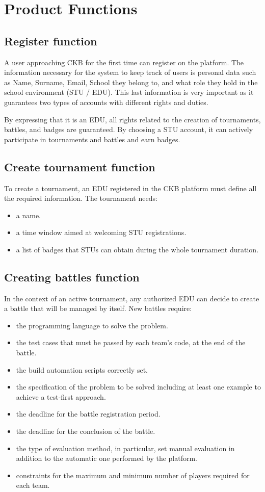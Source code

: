 \section{Product Functions}
\subsection{Register function}
A user approaching CKB for the first time can register on the platform.
The information necessary for the system to keep track of users is personal data such as Name, Surname, Email, School they belong to, and what role they hold in the school environment (STU / EDU).
This last information is very important as it guarantees two types of accounts with different rights and duties.

By expressing that it is an EDU, all rights related to the creation of tournaments, battles, and badges are guaranteed.
By choosing a STU account, it can actively participate in tournaments and battles and earn badges.

\subsection{Create tournament function}
To create a tournament, an EDU registered in the CKB platform must define all the required information.
The tournament needs:
\begin{itemize}
    \item a name.
    \item a time window aimed at welcoming STU registrations.
    \item a list of badges that STUs can obtain during the whole tournament duration.
\end{itemize}

\subsection{Creating battles function}
In the context of an active tournament, any authorized EDU can decide to create a battle that will be managed by itself.
New battles require:
\begin{itemize}
    \item the programming language to solve the problem.
    \item the test cases that must be passed by each team's code, at the end of the battle.
    \item the build automation scripts correctly set.
    \item the specification of the problem to be solved including at least one example to achieve a test-first approach.
    \item the deadline for the battle registration period.
    \item the deadline for the conclusion of the battle.
    \item the type of evaluation method, in particular, set manual evaluation in addition to the automatic one performed by the platform.
    \item constraints for the maximum and minimum number of players required for each team.
\end{itemize}

